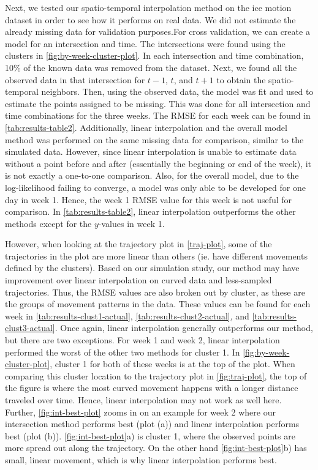 \documentclass[12pt]{article}
\begin{document}
Next, we tested our spatio-temporal interpolation method on the ice
motion dataset in order to see how it performs on real data. We did not
estimate the already missing data for validation purposes.For cross
validation, we can create a model for an intersection and time. The
intersections were found using the clusters in
\cref{fig:by-week-cluster-plot}. In each intersection and time
combination, 10\% of the known data was removed from the dataset. Next,
we found all the observed data in that intersection for \(t-1\), \(t\),
and \(t+1\) to obtain the spatio-temporal neighbors. Then, using the
observed data, the model was fit and used to estimate the points
assigned to be missing. This was done for all intersection and time
combinations for the three weeks. The RMSE for each week can be found in
\cref{tab:results-table2}. Additionally, linear interpolation and the
overall model method was performed on the same missing data for
comparison, similar to the simulated data. However, since linear
interpolation is unable to estimate data without a point before and
after (essentially the beginning or end of the week), it is not exactly
a one-to-one comparison. Also, for the overall model, due to the
log-likelihood failing to converge, a model was only able to be
developed for one day in week 1. Hence, the week 1 RMSE value for this
week is not useful for comparison. In \cref{tab:results-table2}, linear
interpolation outperforms the other methods except for the \(y\)-values
in week 1.

However, when looking at the trajectory plot in \cref{traj-plot}, some
of the trajectories in the plot are more linear than others (ie. have
different movements defined by the clusters). Based on our simulation
study, our method may have improvement over linear interpolation on
curved data and less-sampled trajectories. Thus, the RMSE values are
also broken out by cluster, as these are the groups of movement patterns
in the data. These values can be found for each week in
\cref{tab:results-clust1-actual}, \cref{tab:results-clust2-actual}, and
\cref{tab:results-clust3-actual}. Once again, linear interpolation
generally outperforms our method, but there are two exceptions. For week
1 and week 2, linear interpolation performed the worst of the other two
methods for cluster 1. In \cref{fig:by-week-cluster-plot}, cluster 1 for
both of these weeks is at the top of the plot. When comparing this
cluster location to the trajectory plot in \cref{fig:traj-plot}, the top
of the figure is where the most curved movement happens with a longer
distance traveled over time. Hence, linear interpolation may not work as
well here. Further, \cref{fig:int-best-plot} zooms in on an example for
week 2 where our intersection method performs best (plot (a)) and linear
interpolation performs best (plot (b)). \cref{fig:int-best-plot}a) is
cluster 1, where the observed points are more spread out along the
trajectory. On the other hand \cref{fig:int-best-plot}b) has small,
linear movement, which is why linear interpolation performs best.
\end{document}
